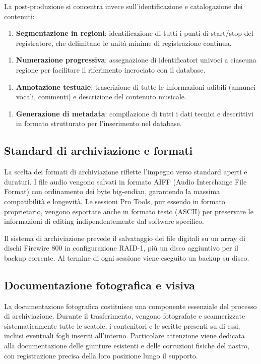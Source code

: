La post-produzione si concentra invece sull'identificazione e catalogazione dei contenuti:

\begin{enumerate}
    \item \textbf{Segmentazione in regioni}: identificazione di tutti i punti di start/stop del registratore, che delimitano le unità minime di registrazione continua.
\end{enumerate}

\begin{enumerate}
    \item \textbf{Numerazione progressiva}: assegnazione di identificatori univoci a ciascuna regione per facilitare il riferimento incrociato con il database.
\end{enumerate}

\begin{enumerate}
    \item \textbf{Annotazione testuale}: trascrizione di tutte le informazioni udibili (annunci vocali, commenti) e descrizione del contenuto musicale.
\end{enumerate}

\begin{enumerate}
    \item \textbf{Generazione di metadata}: compilazione di tutti i dati tecnici e descrittivi in formato strutturato per l'inserimento nel database.
\end{enumerate}
\subsection{Standard di archiviazione e formati}
La scelta dei formati di archiviazione riflette l'impegno verso standard aperti e duraturi. I file audio vengono salvati in formato AIFF (Audio Interchange File Format) con ordinamento dei byte big-endian, garantendo la massima compatibilità e longevità\cite[p. 174]{Bernardini2012themul}. Le sessioni Pro Tools, pur essendo in formato proprietario, vengono esportate anche in formato testo (ASCII) per preservare le informazioni di editing indipendentemente dal software specifico.

Il sistema di archiviazione prevede il salvataggio dei file digitali su un array di dischi Firewire 800 in configurazione RAID-1, più un disco aggiuntivo per il backup corrente. Al termine di ogni sessione viene eseguito un backup su disco.
\subsection{Documentazione fotografica e visiva}
La documentazione fotografica costituisce una componente essenziale del processo di archiviazione. Durante il trasferimento, vengono fotografate e scannerizzate sistematicamente tutte le scatole, i contenitori e le scritte presenti su di essi, inclusi eventuali fogli inseriti all'interno. Particolare attenzione viene dedicata alla documentazione delle giunture esistenti e delle corruzioni fisiche del nastro, con registrazione precisa della loro posizione lungo il supporto\cite[p. 172]{Bernardini2007recoveringgia}. 

